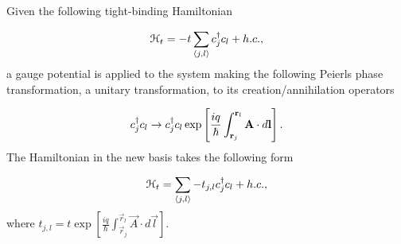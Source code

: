 
Given the following tight-binding Hamiltonian

\begin{equation}
  \mathcal{H}_t = -t \sum_{\langle j, l \rangle} c^{\dagger}_j c_{l} + h.c.,
\end{equation}
a gauge potential is applied to the system making the following Peierls phase transformation, a unitary transformation, to its creation/annihilation operators

\begin{align}
  c^{\dagger}_j c_l \rightarrow c^{\dagger}_j c_l \exp \left[{\frac{iq}{\hbar} \int^{\mathbf{r}_l}_{\mathbf{r}_j} \mathbf{A}\cdot d\mathbf{l}} \right].
\end{align}
The Hamiltonian in the new basis takes the following form

\begin{equation}
  \mathcal{H}_t = \sum_{\langle j, l \rangle} -t_{j,l} c^{\dagger}_j c_{l} + h.c.,
\end{equation}
where $t_{j,l} = t \exp \left[{\frac{iq}{\hbar} \int^{\vec{r}_l}_{\vec{r}_j} \vec{A}\cdot d\vec{l}} \right]$.

